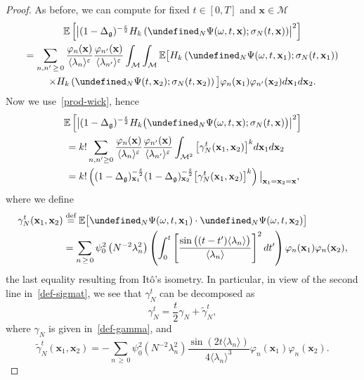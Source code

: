 \documentclass[AHL,Unicode,longabstracts,published]{cedram}
\newcommand{\E}{\mathbb{E}}
\newcommand{\deff}{\overset{\textup{def}}{=}}
\let\P= \undefined
\newcommand{\P}{\mathbf{P}}
\newcommand{\x}{\mathbf{x}}
\newcommand{\M}{\mathcal{M}}
\newcommand{\g}{\mathfrak{g}}
\newcommand{\Dlg}{\Delta_{\g}}
\newcommand{\eps}{\varepsilon}
\newcommand{\s}{\sigma}
\renewcommand{\o}{\omega}
\newcommand{\jb}[1] {\langle #1 \rangle}
\begin{document}
\begin{proof}
As before, we can compute for fixed $t\in [0,T]$ and $\x\in\M$
\begin{multline*}
\E\left[\left|(1-\Dlg)^{-\frac\eps2}H_k\left(\P_N\Psi(\o,t,\x);\s_N(t,\x)\right)\right|^2\right]\\
=\sum_{n,n'\,\geq\,0}\frac{\varphi_n(\x)}{\jb{\lambda_n}^{\eps}}\frac{\varphi_{n'}(\x)}{\jb{\lambda_{n'}}^{\eps}}\int_{\M}\int_{\M}\E\big[H_k\left(\P_N\Psi(\o,t,\x_1);\s_N(t,\x_1)\right)\\
\times H_k\left(\P_N\Psi(t,\x_2);\s_N(t,\x_2)\right)\big]\varphi_n(\x_1)\varphi_{n'}(\x_2)d\x_1d\x_2.
\end{multline*}
Now we use~\eqref{prod-wick}, hence
\begin{multline*}
\E\left[\left|(1-\Dlg)^{-\frac\eps2}H_k\big(\P_N\Psi(\o,t,\x);\s_N(t,\x)\big)\right|^2\right]\\
\begin{aligned}
&=k!\sum_{n,n'\geq 0}\frac{\varphi_n(\x)}{\jb{\lambda_n}^{\eps}}\frac{\varphi_{n'}(\x)}{\jb{\lambda_{n'}}^{\eps}}\int_{\M^2}\big[\gamma_N^t(\x_1,\x_2)\big]^kd\x_1d\x_2\\
&=k!\left((1-\Dlg)_{\x_1}^{-\frac\eps2}(1-\Dlg)_{\x_2}^{-\frac\eps2}\big[\gamma_N^t(\x_1,\x_2)\big]^k\right)\big|_{\x_1=\x_2=\x},
\end{aligned}
\end{multline*}
where we define
\begin{align*}
\gamma_N^t(\x_1,\x_2) &\deff  \E\big[\P_N\Psi(\o,t,\x_1)\cdot\P_N\Psi(\o,t,\x_2)\big]\\
&= \sum_{n\,\geq\,0}\psi_0^2\left(N^{-2}\lambda_n^2\right)\left(\int_0^t\left[\frac{\sin\big((t-t')\jb{\lambda_n}\big)}{\jb{\lambda_n}}\right]^2dt'\right)\varphi_n(\x_1)\varphi_n(\x_2),
\end{align*}
the last equality resulting from It\^o's isometry. In particular, in view of the second line in~\eqref{def-sigmat}, we see that $\gamma_N^t$ can be decomposed as
\begin{equation*}
\gamma_N^t = \frac{t}{2}\gamma_N + \widetilde{\gamma}_N^t,
\end{equation*}
where $\gamma_N$ is given in~\eqref{def-gamma}, and
\begin{equation*}
\widetilde{\gamma}_N^t(\x_1,\x_2) = -\sum_{n\,\geq\,0}\psi_0^2\left(N^{-2}\lambda_n^2\right)\frac{\sin\left(2t\jb{\lambda_n}\right)}{4\jb{\lambda_n}^3}\varphi_n(\x_1)\varphi_n(\x_2).
\end{equation*}


\end{proof}
\end{document}
